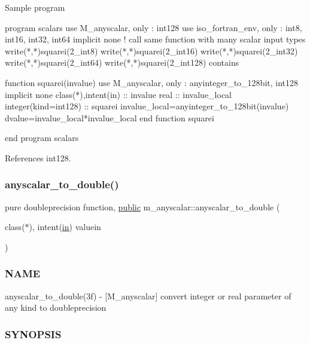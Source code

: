 \begin{DoxyVerb}Sample program

 program scalars
 use M_anyscalar,     only : int128
 use iso_fortran_env, only : int8, int16, int32, int64
 implicit none
    ! call same function with many scalar input types
    write(*,*)squarei(2_int8)
    write(*,*)squarei(2_int16)
    write(*,*)squarei(2_int32)
    write(*,*)squarei(2_int64)
    write(*,*)squarei(2_int128)
 contains

 function squarei(invalue)
 use M_anyscalar, only : anyinteger_to_128bit, int128
 implicit none
 class(*),intent(in)  :: invalue
 real                 :: invalue_local
 integer(kind=int128) :: squarei
    invalue_local=anyinteger_to_128bit(invalue)
    dvalue=invalue_local*invalue_local
 end function squarei

 end program scalars \end{DoxyVerb}
 

References int128.

\mbox{\label{namespacem__anyscalar_a6173dbc57e7c5a96f5961d9e83e6e15e}} 
\subsubsection{\texorpdfstring{anyscalar\+\_\+to\+\_\+double()}{anyscalar\_to\_double()}}
{\footnotesize\ttfamily pure doubleprecision function, \hyperlink{M__stopwatch_83_8txt_a2f74811300c361e53b430611a7d1769f}{public} m\+\_\+anyscalar\+::anyscalar\+\_\+to\+\_\+double (\begin{DoxyParamCaption}\item[{class($\ast$), intent(\hyperlink{M__journal_83_8txt_afce72651d1eed785a2132bee863b2f38}{in})}]{valuein }\end{DoxyParamCaption})}



\subsubsection*{N\+A\+ME}

anyscalar\+\_\+to\+\_\+double(3f) -\/ \mbox{[}M\+\_\+anyscalar\mbox{]} convert integer or real parameter of any kind to doubleprecision 

\subsubsection*{S\+Y\+N\+O\+P\+S\+IS}

